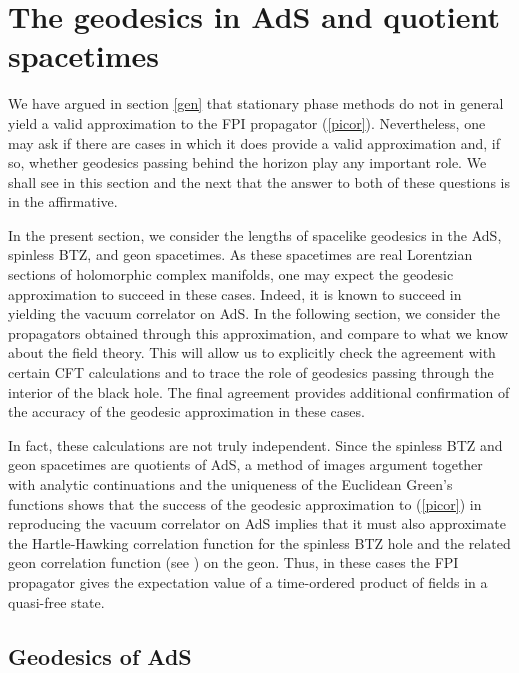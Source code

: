 \documentclass[a4paper,12pt]{article}
\begin{document}
\section{The geodesics in AdS\coordHE{} and quotient spacetimes}
\label{geo}

We have argued in section \ref{gen} that stationary phase methods do
not in general yield a valid approximation to the FPI propagator
(\ref{picor}).  Nevertheless, one may ask if there are cases in which
it does provide a valid approximation and, if so, whether geodesics
passing behind the horizon play any important role.  We shall see in
this section and the next that the answer to both of these questions
is in the affirmative.

In the present section, we consider the lengths of spacelike geodesics
in the AdS\coordHE{}, spinless BTZ, and \coordHE{} geon
spacetimes.  As these spacetimes are real Lorentzian sections of
holomorphic complex manifolds, one may expect the geodesic
approximation to succeed in these cases.  Indeed, it is known
\cite{holopart} to succeed in yielding the vacuum correlator on
AdS\coordHE{}. In the following section, we consider the propagators
obtained through this approximation, and compare to what we know about
the field theory. This will allow us to explicitly check the agreement
with certain CFT calculations and to trace the role of geodesics
passing through the interior of the black hole.  The final agreement
provides additional confirmation of the accuracy of the geodesic
approximation in these cases.

In fact, these calculations are not truly independent. Since the
spinless BTZ and \coordHE{} geon spacetimes are
quotients of AdS\coordHE{}, a method of images argument together with
analytic continuations and the uniqueness of the Euclidean Green's
functions shows that the success of the geodesic approximation to
(\ref{picor}) in reproducing the vacuum correlator on AdS\coordHE{} implies
that it must also approximate the Hartle-Hawking correlation function
for the spinless BTZ hole and the related geon correlation function
(see \cite{LM}) on the \coordHE{} geon. Thus, in
these cases the FPI propagator gives the expectation value of a
time-ordered product of fields in a quasi-free state.

\subsection{Geodesics of AdS\coordHE{}}
\label{review}
\end{document}

